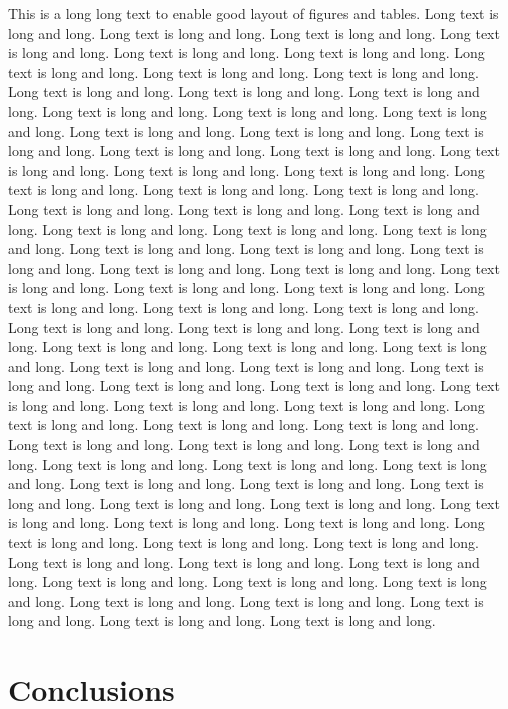 \documentclass[11pt,a4paper,twoside]{article}
\begin{document}
This is a long long text to enable good layout of figures and tables. Long text is long and long. Long text is long and long. Long text is long and long. Long text is long and long. Long text is long and long. Long text is long and long. Long text is long and long. Long text is long and long. Long text is long and long. Long text is long and long. Long text is long and long. Long text is long and long. Long text is long and long. Long text is long and long. Long text is long and long. Long text is long and long. Long text is long and long. Long text is long and long. Long text is long and long. Long text is long and long. Long text is long and long. Long text is long and long. Long text is long and long. Long text is long and long. Long text is long and long. Long text is long and long. Long text is long and long. Long text is long and long. Long text is long and long. Long text is long and long. Long text is long and long. Long text is long and long. Long text is long and long. Long text is long and long. Long text is long and long. Long text is long and long. Long text is long and long. Long text is long and long. Long text is long and long. Long text is long and long. Long text is long and long. Long text is long and long. Long text is long and long. Long text is long and long. Long text is long and long. Long text is long and long. Long text is long and long. Long text is long and long. Long text is long and long. Long text is long and long. Long text is long and long. Long text is long and long. Long text is long and long. Long text is long and long. Long text is long and long. Long text is long and long. Long text is long and long. Long text is long and long. Long text is long and long. Long text is long and long. Long text is long and long. Long text is long and long. Long text is long and long. Long text is long and long. Long text is long and long. Long text is long and long. Long text is long and long. Long text is long and long. Long text is long and long. Long text is long and long. Long text is long and long. Long text is long and long. Long text is long and long. Long text is long and long. Long text is long and long. Long text is long and long. Long text is long and long. Long text is long and long. Long text is long and long. Long text is long and long. Long text is long and long. Long text is long and long. Long text is long and long. Long text is long and long. Long text is long and long. Long text is long and long. Long text is long and long. Long text is long and long.


\section{Conclusions}
\end{document}
